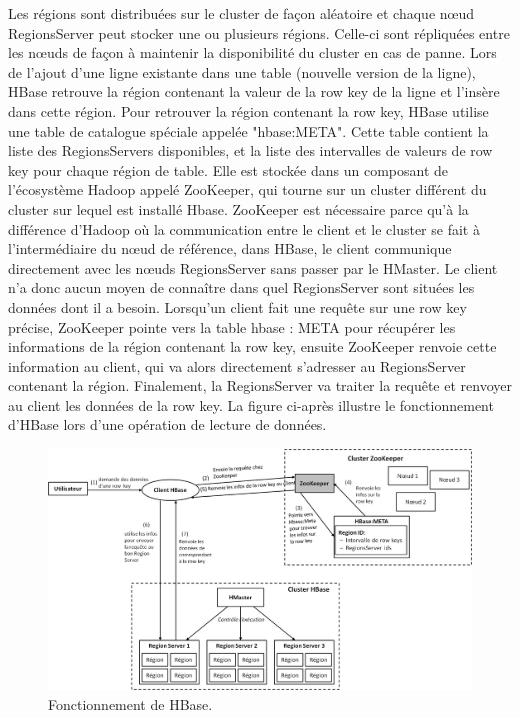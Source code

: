 \newpage
Les régions sont distribuées sur le cluster de façon aléatoire et chaque nœud RegionsServer peut stocker une ou plusieurs régions. Celle-ci sont répliquées entre les nœuds de façon à maintenir la disponibilité du cluster en cas de panne. Lors de l'ajout d'une ligne existante dans une table (nouvelle version de la ligne), HBase retrouve la région contenant la valeur de la row key de la ligne et l'insère dans cette région. Pour retrouver la région contenant la row key, HBase utilise une table de catalogue spéciale appelée "hbase:META". Cette table contient la liste des RegionsServers disponibles, et la liste des intervalles de valeurs de row key pour chaque région de table. Elle est stockée dans un composant de l'écosystème Hadoop appelé ZooKeeper, qui tourne sur un cluster différent du cluster sur lequel est installé Hbase. ZooKeeper est nécessaire parce qu'à la différence d'Hadoop où la communication entre le client et le cluster se fait à l'intermédiaire du nœud de référence, dans HBase, le client communique directement avec les nœuds RegionsServer sans passer par le HMaster. Le client n'a donc aucun moyen de connaître dans quel RegionsServer sont situées les données dont il a besoin. Lorsqu'un client fait une requête sur une row key précise, ZooKeeper pointe vers la table hbase : META pour récupérer les informations de la région contenant la row key, ensuite ZooKeeper renvoie cette information au client, qui va alors directement s'adresser au RegionsServer contenant la région. Finalement, la RegionsServer va traiter la requête et renvoyer au client les données de la row key.  La figure ci-après illustre le fonctionnement d'HBase lors d'une opération de lecture de données.

\begin{figure}[h]
	\centering
    \includegraphics[scale=0.4]{img/part2/2.4}
    \caption{Fonctionnement de HBase.}
\end{figure}

